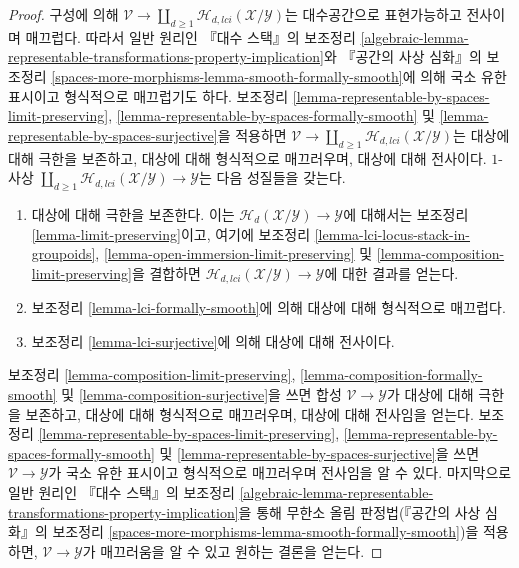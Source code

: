 \begin{proof}
\medskip\noindent
구성에 의해 $\mathcal{V} \to
\coprod\nolimits_{d \geq 1} \mathcal{H}_{d, lci}(\mathcal{X}/\mathcal{Y})$는
대수공간으로 표현가능하고 전사이며 매끄럽다. 따라서 일반 원리인
『대수 스택』의 보조정리
\ref{algebraic-lemma-representable-transformations-property-implication}와
『공간의 사상 심화』의 보조정리
\ref{spaces-more-morphisms-lemma-smooth-formally-smooth}에 의해 국소 유한
표시이고 형식적으로 매끄럽기도 하다. 보조정리
\ref{lemma-representable-by-spaces-limit-preserving},
\ref{lemma-representable-by-spaces-formally-smooth} 및
\ref{lemma-representable-by-spaces-surjective}을 적용하면
$\mathcal{V} \to
\coprod\nolimits_{d \geq 1} \mathcal{H}_{d, lci}(\mathcal{X}/\mathcal{Y})$는
대상에 대해 극한을 보존하고, 대상에 대해 형식적으로 매끄러우며,
대상에 대해 전사이다. $1$-사상
$\coprod\nolimits_{d \geq 1} \mathcal{H}_{d, lci}(\mathcal{X}/\mathcal{Y})
\to \mathcal{Y}$는 다음 성질들을 갖는다.
\begin{enumerate}
\item 대상에 대해 극한을 보존한다. 이는
$\mathcal{H}_d(\mathcal{X}/\mathcal{Y}) \to \mathcal{Y}$에 대해서는
보조정리 \ref{lemma-limit-preserving}이고, 여기에 보조정리
\ref{lemma-lci-locus-stack-in-groupoids},
\ref{lemma-open-immersion-limit-preserving} 및
\ref{lemma-composition-limit-preserving}을 결합하면
$\mathcal{H}_{d, lci}(\mathcal{X}/\mathcal{Y}) \to \mathcal{Y}$에 대한
결과를 얻는다.
\item 보조정리 \ref{lemma-lci-formally-smooth}에 의해 대상에 대해
형식적으로 매끄럽다.
\item 보조정리 \ref{lemma-lci-surjective}에 의해 대상에 대해 전사이다.
\end{enumerate}
보조정리 \ref{lemma-composition-limit-preserving},
\ref{lemma-composition-formally-smooth} 및
\ref{lemma-composition-surjective}을 쓰면 합성
$\mathcal{V} \to \mathcal{Y}$가 대상에 대해 극한을 보존하고, 대상에 대해
형식적으로 매끄러우며, 대상에 대해 전사임을 얻는다. 보조정리
\ref{lemma-representable-by-spaces-limit-preserving},
\ref{lemma-representable-by-spaces-formally-smooth} 및
\ref{lemma-representable-by-spaces-surjective}을 쓰면
$\mathcal{V} \to \mathcal{Y}$가 국소 유한 표시이고 형식적으로
매끄러우며 전사임을 알 수 있다. 마지막으로 일반 원리인
『대수 스택』의 보조정리
\ref{algebraic-lemma-representable-transformations-property-implication}을
통해 무한소 올림 판정법(『공간의 사상 심화』의 보조정리
\ref{spaces-more-morphisms-lemma-smooth-formally-smooth})을 적용하면,
$\mathcal{V} \to \mathcal{Y}$가 매끄러움을 알 수 있고 원하는 결론을 얻는다.
\end{proof}








